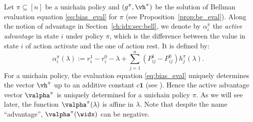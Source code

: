Let $\pi\subseteq[n]$ be a unichain policy and $(g^\pi, \vh^\pi)$ be the solution of Bellman evaluation equation \eqref{eq:bias_eval} for $\pi$ (see Proposition~\ref{prop:be_eval}).
Along the notion of advantage in Section~\ref{ch:idx:sec:bell}, we denote by $\alpha^{\pi}_i$ the \emph{active advantage} in state $i$ under policy $\pi$, which is the difference between the value in state $i$ of action activate and the one of action rest.
It is defined by:
\begin{equation}
    \label{eq:advantage}
    \alpha^\pi_i(\lambda):=r^1_i -r^0_i -\lambda +\sum_{j=1}^n (P^1_{ij} -P^0_{ij})h^\pi_j(\lambda).
\end{equation}
For a unichain policy, the evaluation equation \eqref{eq:bias_eval} uniquely determines the vector $\vh^\pi$ up to an additive constant $c\mathbf{1}$ (see \cite[Chapter 8]{puterman2014markov}).
Hence the active advantage vector $\valpha^\pi$ is uniquely determined for a unichain policy $\pi$.
As we will see later, the function $\valpha^\pi(\lambda)$ is affine in $\lambda$.
Note that despite the name ``advantage'', $\valpha^{\pi}(\widx)$ can be negative.

